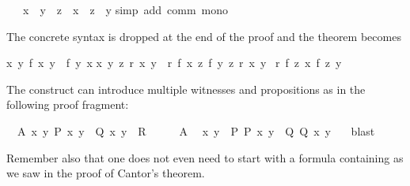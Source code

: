 \begin{isabellebody}
\ \ \ {\isachardoublequote}x\ {\isachargreater}\ y\ {\isasymLongrightarrow}\ z\ {\isacharplus}{\isacharplus}\ x\ {\isachargreater}\ z\ {\isacharplus}{\isacharplus}\ y{\isachardoublequote}\isanewline
\isamarkupfalse%
simp\ add{\isacharcolon}\ comm\ mono{\isacharparenright}\isamarkupfalse%
%
\begin{isamarkuptext}%
\noindent The concrete syntax is dropped at the end of the proof and the
theorem becomes \begin{isabelle}%
{\isasymlbrakk}{\isasymAnd}x\ y{\isachardot}\ {\isacharquery}f\ x\ y\ {\isacharequal}\ {\isacharquery}f\ y\ x{\isacharsemicolon}\isanewline
\isaindent{\ \ \ }{\isasymAnd}x\ y\ z{\isachardot}\ {\isacharquery}r\ x\ y\ {\isasymLongrightarrow}\ {\isacharquery}r\ {\isacharparenleft}{\isacharquery}f\ x\ z{\isacharparenright}\ {\isacharparenleft}{\isacharquery}f\ y\ z{\isacharparenright}{\isacharsemicolon}\ {\isacharquery}r\ {\isacharquery}x\ {\isacharquery}y{\isasymrbrakk}\isanewline
{\isasymLongrightarrow}\ {\isacharquery}r\ {\isacharparenleft}{\isacharquery}f\ {\isacharquery}z\ {\isacharquery}x{\isacharparenright}\ {\isacharparenleft}{\isacharquery}f\ {\isacharquery}z\ {\isacharquery}y{\isacharparenright}%
\end{isabelle}
\tweakskip%
\end{isamarkuptext}%
\isamarkuptrue%
%
\isamarkuptrue%
%
\begin{isamarkuptext}%
The  construct can introduce multiple
witnesses and propositions as in the following proof fragment:%
\end{isamarkuptext}%
\isamarkuptrue%
\ \ A{\isacharcolon}\ {\isachardoublequote}{\isasymexists}x\ y{\isachardot}\ P\ x\ y\ {\isasymand}\ Q\ x\ y{\isachardoublequote}\ \ {\isachardoublequote}R{\isachardoublequote}\isanewline
\isamarkupfalse%
\ {\isacharminus}\isanewline
\ \ \isamarkupfalse%
\ A\ \isamarkupfalse%
\ x\ y\ \ P{\isacharcolon}\ {\isachardoublequote}P\ x\ y{\isachardoublequote}\ \ Q{\isacharcolon}\ {\isachardoublequote}Q\ x\ y{\isachardoublequote}\ \ \isamarkupfalse%
\ blast\isamarkupfalse%
\isamarkupfalse%
%
\begin{isamarkuptext}%
Remember also that one does not even need to start with a formula
containing \isa{{\isasymexists}} as we saw in the proof of Cantor's theorem.%
\end{isamarkuptext}%

\end{isabellebody}
